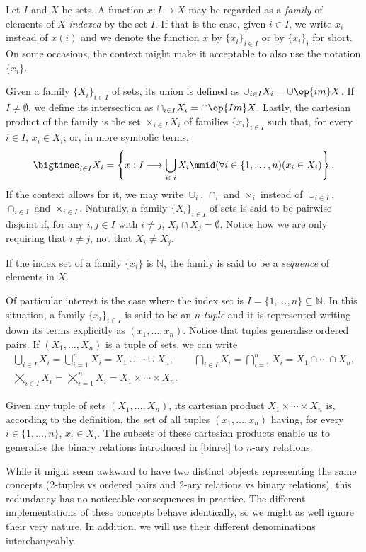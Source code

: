 \begin{definition}
Let $I$ and $X$ be sets. A function $x:I\longrightarrow X$ may be regarded as a \emph{family} of elements of $X$ \emph{indexed} by the set $I$.
If that is the case, given $i\in I$, we write $x_i$ instead of $x(i)$ and we denote the function $x$ by $\{x_i\}_{i\in I}$ or by $\{x_i\}_i$ for short. 
On some occasions, the context might make it acceptable to also use the notation $\{x_i\}$.

Given a family $\{X_i\}_{i\in I}$ of sets, its union is defined as $\cup_{i\in I} X_i = \cup \op{im} X$.
If $I\neq \emptyset$, we define its intersection as $\cap_{i\in I} X_i = \cap \op{Im} X$.
Lastly, the cartesian product of the family is the set $\times_{i\in I} X_i$ of families $\{x_i\}_{i\in I}$ such that, for every $i\in I$, $x_i \in X_i$; or, in more symbolic terms,
\[ \bigtimes_{i\in I} X_i= \left\{x : I \longrightarrow \bigcup_{i\in i} X_i \mmid (\forall i\in\{1,\ldots,n)(x_i\in X_i)\right\}.\] 
If the context allows for it, we may write $\cup_i$, $\cap_i$ and $\times_i$ instead of $\cup_{i\in I}$, $\cap_{i\in I}$ and $\times_{i\in I}$.
Naturally, a family $\{X_i\}_{i\in I}$ of sets is said to be pairwise disjoint if, for any $i,j\in I$ with $i\neq j$, $X_i \cap X_j = \emptyset$. Notice how we are only requiring that $i\neq j$, not that $X_i\neq X_j$.

If the index set of a family $\{x_i\}$ is $\mathbb{N}$, the family is said to be a \emph{sequence} of elements in $X$.

Of particular interest is the case where the index set is $I = \{1,\ldots,n\}\subseteq \mathbb{N}$.
In this situation, a family $\{x_i\}_{i\in I}$ is said to be an $n$-\emph{tuple} and it is represented writing down its terms explicitly as $(x_1,\ldots,x_n)$. Notice that tuples generalise ordered pairs. 
If $(X_1,\ldots,X_n)$ is a tuple of sets, we can write
\begin{gather*}
\bigcup_{i\in I} X_i = \bigcup_{i=1}^n X_i = X_1\cup \cdots \cup X_n,\qquad \bigcap_{i\in I} X_i = \bigcap_{i=1}^n X_i = X_1 \cap \cdots \cap X_n,\\
\bigtimes_{i\in I} X_i = \bigtimes_{i=1}^n X_i = X_1\times\cdots\times X_n.
\end{gather*} 

Given any tuple of sets $(X_1,\ldots,X_n)$, its cartesian product $X_1\times \cdots\times X_n$ is, according to the definition, the set of all tuples $(x_1,\ldots,x_n)$ having, for every $i\in\{1,\ldots,n\}$, $x_i\in X_i$. 
The subsets of these cartesian products enable us to generalise the binary relations introduced in \ref{binrel} to $n$-ary relations.

While it might seem awkward to have two distinct objects representing the same concepts (2-tuples vs ordered pairs and 2-ary relations vs binary relations), this redundancy has no noticeable consequences in practice.
The different implementations of these concepts behave identically, so we might as well ignore their very nature.
In addition, we will use their different denominations interchangeably.
\label{<+label+>}
\end{definition}

